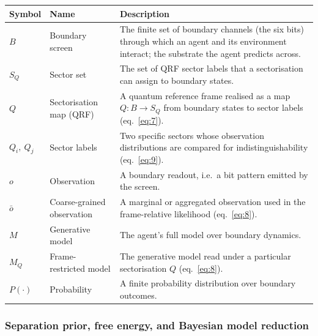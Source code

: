 \documentclass[
]{article}
\newcounter{none} %
\begin{document}
{\def\LTcaptype{none} %
\begin{longtable}[]{@{}
  >{\raggedright\arraybackslash}p{}
  >{\raggedright\arraybackslash}p{}
  >{\raggedright\arraybackslash}p{}@{}}
\toprule\noalign{}
\begin{minipage}[b]{\linewidth}\raggedright
Symbol
\end{minipage} & \begin{minipage}[b]{\linewidth}\raggedright
Name
\end{minipage} & \begin{minipage}[b]{\linewidth}\raggedright
Description
\end{minipage} \\
\midrule\noalign{}
\endhead
\bottomrule\noalign{}
\endlastfoot
\(B\) & Boundary screen & The finite set of boundary channels (the six
bits) through which an agent and its environment interact; the substrate
the agent predicts across. \\
\(S_Q\) & Sector set & The set of QRF sector labels that a sectorisation
can assign to boundary states. \\
\(Q\) & Sectorisation map (QRF) & A quantum reference frame realised as
a map \(Q: B \rightarrow S_Q\) from boundary states to sector labels
(eq.~\ref{eq:7}). \\
\(Q_i,\ Q_j\) & Sector labels & Two specific sectors whose observation
distributions are compared for indistinguishability (eq.~\ref{eq:9}). \\
\(o\) & Observation & A boundary readout, i.e.~a bit pattern emitted by
the screen. \\
\(\bar{o}\) & Coarse-grained observation & A marginal or aggregated
observation used in the frame-relative likelihood (eq.~\ref{eq:8}). \\
\(M\) & Generative model & The agent's full model over boundary
dynamics. \\
\(M_Q\) & Frame-restricted model & The generative model read under a
particular sectorisation \(Q\) (eq.~\ref{eq:8}). \\
\(P(\cdot)\) & Probability & A finite probability distribution over
boundary outcomes. \\
\end{longtable}
}

\subsubsection{Separation prior, free energy, and Bayesian model
reduction}\label{separation-prior-free-energy-and-bayesian-model-reduction}
\end{document}
